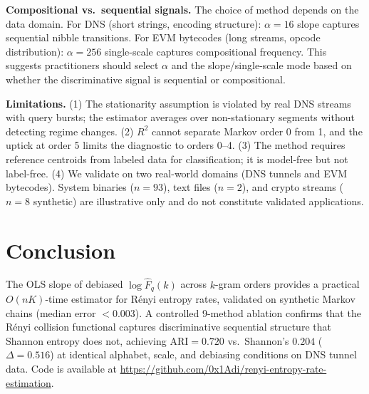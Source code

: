 \documentclass[conference]{IEEEtran}
\begin{document}
\textbf{Compositional vs.\ sequential signals.}
The choice of method depends on the data domain. For DNS (short strings, encoding structure): $\alpha=16$ slope captures sequential nibble transitions. For EVM bytecodes (long streams, opcode distribution): $\alpha=256$ single-scale captures compositional frequency. This suggests practitioners should select $\alpha$ and the slope/single-scale mode based on whether the discriminative signal is sequential or compositional.

\textbf{Limitations.}
(1) The stationarity assumption is violated by real DNS streams with query bursts; the estimator averages over non-stationary segments without detecting regime changes.
(2) $R^2$ cannot separate Markov order 0 from 1, and the uptick at order 5 limits the diagnostic to orders 0--4.
(3) The method requires reference centroids from labeled data for classification; it is model-free but not label-free.
(4) We validate on two real-world domains (DNS tunnels and EVM bytecodes). System binaries ($n=93$), text files ($n=2$), and crypto streams ($n=8$ synthetic) are illustrative only and do not constitute validated applications.

\section{Conclusion}

The OLS slope of debiased $\log \hat{F}_q(k)$ across $k$-gram orders provides a practical $O(nK)$-time estimator for R\'enyi entropy rates, validated on synthetic Markov chains (median error ${<}0.003$). A controlled 9-method ablation confirms that the R\'enyi collision functional captures discriminative sequential structure that Shannon entropy does not, achieving $\mathrm{ARI} = 0.720$ vs.\ Shannon's $0.204$ ($\Delta = 0.516$) at identical alphabet, scale, and debiasing conditions on DNS tunnel data. Code is available at \url{https://github.com/0x1Adi/renyi-entropy-rate-estimation}.



\end{document}
